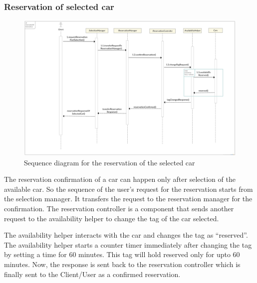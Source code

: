 \subsubsection{Reservation of selected car}
\begin{figure}[h]
	\centering
	\includegraphics[width=\linewidth,keepaspectratio]{figures/reservation_runtime.eps}
	\caption{Sequence diagram for the reservation of the selected car}
	\label{fig:reservation_runtime}
\end{figure}

The reservation confirmation of a car can happen only after selection of the available car. So the sequence of the user's request for the reservation starts from the selection manager. It transfers the request to the reservation manager for the confirmation. The reservation controller is a component that sends another request to the availability helper
to change the tag of the car selected.

The availability helper interacts with the car and changes the tag as ``reserved''. The availability helper starts a counter timer immediately after changing the tag by setting a time for 60 minutes. This tag will hold reserved only for upto 60 minutes. Now, the response is sent back to the reservation controller which is finally sent to the Client/User as a confirmed reservation.

